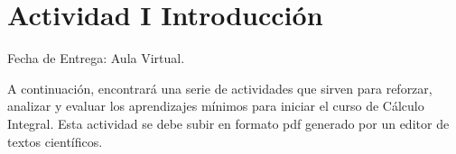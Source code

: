 \section{Actividad I Introducción}

Fecha de Entrega: Aula Virtual.

A continuación, encontrará una serie de actividades que sirven para reforzar, analizar y evaluar los aprendizajes mínimos para iniciar el curso de Cálculo Integral. Esta actividad se debe subir en formato pdf generado por un editor de textos científicos.